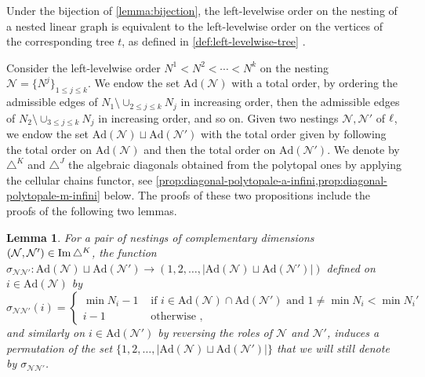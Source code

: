 \documentclass[twoside, 11pt]{amsart}
\newtheorem{lemma}[definition]{Lemma}
\theoremstyle{remark}
\begin{document}
\noindent  Under the bijection of \cref{lemma:bijection}, the left-levelwise order on the nesting of a nested linear graph is equivalent to the left-levelwise order on the vertices of the corresponding tree $t$, as defined in \cref{def:left-levelwise-tree} .


Consider the left-levelwise order $N^1<N^2<\cdots < N^k$ on the nesting $\mathcal{N}=\{N^j\}_{1\leq j \leq k}$.
We endow the set $\mathrm{Ad}(\mathcal{N})$ with a total order, by ordering the admissible edges of $N_1 \setminus \cup_{2\leq j \leq k} N_j$ in increasing order, then the admissible edges of $N_2 \setminus \cup_{3\leq j \leq k} N_j$ in increasing order, and so on. 
Given two nestings $\mathcal{N}, \mathcal{N}'$ of $\ell$, we endow the set $\mathrm{Ad}(\mathcal{N})\sqcup \mathrm{Ad}(\mathcal{N}')$ with the total order given by following the total order on $\mathrm{Ad}(\mathcal{N})$ and then the total order on $\mathrm{Ad}(\mathcal{N}')$. 
We denote by $\triangle^K$ and $\triangle^J$ the algebraic diagonals obtained from the polytopal ones by applying the cellular chains functor, see \cref{prop:diagonal-polytopale-a-infini,prop:diagonal-polytopale-m-infini} below. 
The proofs of these two propositions include the proofs of the following two lemmas. 

\begin{lemma} 
\label{prop:signs-ass}
For a pair of nestings of complementary dimensions $(\mathcal{N}, \mathcal{N}')\in \operatorname{Im}\triangle^K$, the function $\sigma_{\mathcal{N}\mathcal{N}'}: \mathrm{Ad}(\mathcal{N})\sqcup \mathrm{Ad}(\mathcal{N}') \to (1,2,\ldots,|\mathrm{Ad}(\mathcal{N})\sqcup \mathrm{Ad}(\mathcal{N}')|)$ defined on $i \in \mathrm{Ad}(\mathcal{N})$ by 
\begin{equation*}
  \sigma_{\mathcal{N}\mathcal{N}'}(i)= 
  \begin{cases}
    \min N_i -1 & \text{ if } i \in \mathrm{Ad}(\mathcal{N})\cap \mathrm{Ad}(\mathcal{N}') \text{ and } 1 \neq \min N_i < \min N_i' \\ 
    i-1 & \text{ otherwise ,} 
  \end{cases}
\end{equation*}
and similarly on $i \in \mathrm{Ad}(\mathcal{N}')$ by reversing the roles of $\mathcal{N}$ and $\mathcal{N}'$, induces a permutation of the set $\{1,2,\ldots,|\mathrm{Ad}(\mathcal{N})\sqcup \mathrm{Ad}(\mathcal{N}')|\}$ that we will still denote by $\sigma_{\mathcal{N}\mathcal{N}'}$.
\end{lemma}
\end{document}
